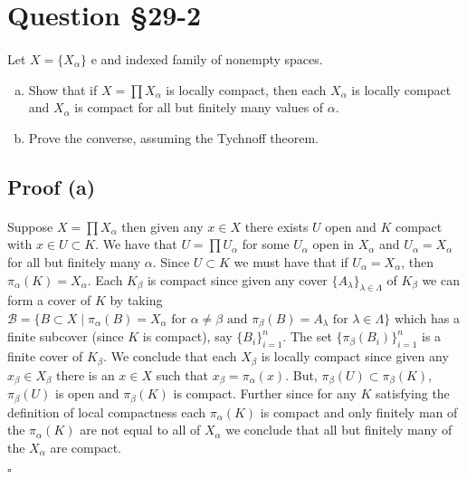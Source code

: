 \documentclass[11pt, oneside]{article}   	%
\newcommand{\scr}[1]{\mathscr{#1}}
\newcommand{\tand}{\text{ and }}
\newcommand{\tfor}{\text{ for }}
\newcommand{\st}{\mid}
\newcommand{\qed}{\begin{center}
$\square$
\end{center}}
\newcommand{\set}[1]{\{ #1 \}}
\begin{document}
\section*{Question \S29-2}
\paragraph{}

Let $X = \set{X_\alpha}$ e and indexed family of nonempty spaces.

\begin{enumerate}[(a)]
\item
Show that if $X = \prod X_\alpha$ is locally compact, then each $X_\alpha$ is locally compact and $X_\alpha$ is compact for all but finitely many values of $\alpha$.
\item
Prove the converse, assuming the Tychnoff theorem.
\end{enumerate}

\subsection*{Proof (a)}
\paragraph{}

Suppose $X = \prod X_\alpha$ then given any $x \in  X$ there exists $U$ open and $K$ compact with $x \in U \subset K$. We have that $U = \prod U_\alpha$ for some $U_\alpha$ open in $X_\alpha$ and $U_\alpha = X_\alpha$ for all but finitely many $\alpha$. Since $U \subset K$ we must have that if $U_\alpha = X_\alpha$, then $\pi_\alpha(K) = X_\alpha$. Each $K_\beta$ is compact since given any cover $\set{A_\lambda}_{\lambda \in \Lambda}$ of $K_\beta$ we can form a cover of $K$ by taking $\scr{B} = \set{B \subset X \st \pi_\alpha (B) = X_\alpha \tfor \alpha \neq \beta \tand \pi_\beta (B) = A_\lambda \tfor \lambda \in \Lambda}$ which has a finite subcover (since $K$ is compact), say $\set{B_i}_{i = 1}^n$. The set $\set{\pi_\beta (B_i)}_{i = 1}^n$ is a finite cover of $K_\beta$. We conclude that each $X_\beta$ is locally compact since given any $x_\beta \in X_\beta$ there is an $x \in X$ such that $x_\beta = \pi_\alpha(x)$. But, $\pi_\beta(U) \subset \pi_\beta(K)$, $\pi_\beta(U)$ is open and $\pi_\beta(K)$ is compact. Further since for any $K$ satisfying the definition of local compactness each $\pi_\alpha(K)$ is compact and only finitely man of the $\pi_\alpha(K)$ are not equal to all of $X_\alpha$ we conclude that all but finitely many of the $X_\alpha$ are compact. \qed
\end{document}
